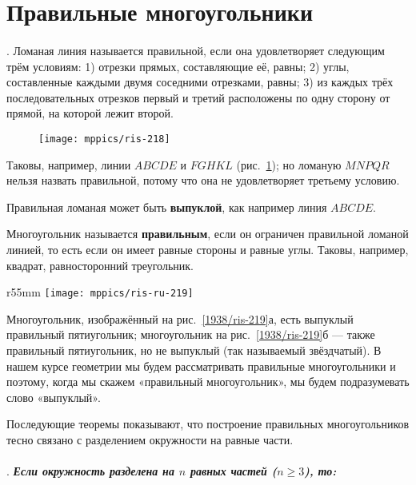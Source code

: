 \section{Правильные многоугольники}

\paragraph{}\label{1938/212}
.
Ломаная линия называется правильной, если она удовлетворяет следующим трём условиям:
1) отрезки прямых, составляющие её, равны;
2) углы, составленные каждыми двумя соседними отрезками, равны;
3) из каждых трёх последовательных отрезков первый и третий расположены по одну сторону от прямой, на которой лежит второй.

\begin{figure}[h]
\centering
\texttt{[image: mppics/ris-218]}
\caption{}\label{1938/ris-218}
\end{figure}

Таковы, например, линии $ABCDE$ и $FGHKL$ (рис.~\ref{1938/ris-218});
но ломаную $MNPQR$ нельзя назвать правильной, потому что она не удовлетворяет третьему условию.

Правильная ломаная может быть \textbf{выпуклой}, как например линия $ABCDE$.

Многоугольник называется \textbf{правильным}, если он ограничен правильной ломаной линией, то есть если он имеет равные стороны и равные углы.
Таковы, например, квадрат, равносторонний треугольник.

\begin{wrapfigure}{r}{55mm}
\centering
\texttt{[image: mppics/ris-ru-219]}
\caption{}\label{1938/ris-219}
\end{wrapfigure}

Многоугольник, изображённый на рис.~\ref{1938/ris-219}а, есть выпуклый правильный пятиугольник;
многоугольник на рис.~\ref{1938/ris-219}б — также правильный пятиугольник, но не выпуклый (так называемый звёздчатый).
В нашем курсе геометрии мы будем рассматривать  правильные многоугольники и поэтому, когда мы скажем «правильный многоугольник», мы будем подразумевать слово «выпуклый».

{\sloppy 
Последующие теоремы показывают, что построение правильных многоугольников тесно связано с разделением окружности на равные части.

}

\paragraph{}\label{1938/213}
.
\textbf{\emph{Если окружность разделена на $n$ равных частей ($n\ge 3$), то:}}

